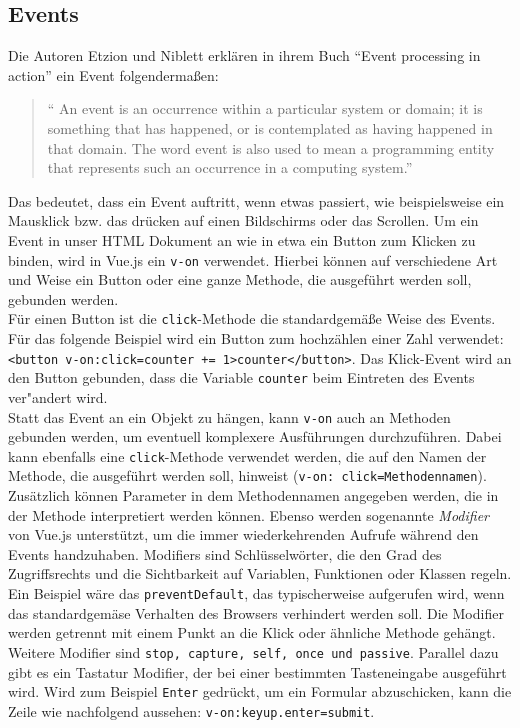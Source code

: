 \subsection*{Events}
Die Autoren Etzion und Niblett erkl\"aren in ihrem Buch \enquote{Event processing in action} ein Event folgenderma\ss{}en:
\begin{quotation}
\enquote{ An event is an occurrence within a particular system or domain; it is
something that has happened, or is contemplated as having happened in that
domain. The word event is also used to mean a programming entity that represents such an occurrence in a computing system\cite{Etzion&Niblett2011}.}
\end{quotation}
Das bedeutet, dass ein Event auftritt, wenn etwas passiert, wie beispielsweise ein Mausklick bzw. das dr\"ucken auf einen Bildschirms oder das Scrollen.
Um ein Event in unser \ac{HTML} Dokument an  wie in etwa ein Button zum Klicken zu binden, wird in Vue.js ein \texttt{v-on} verwendet. Hierbei k\"onnen auf verschiedene Art und Weise ein Button oder eine ganze Methode, die ausgef\"uhrt werden soll, gebunden werden.\\
F\"ur einen Button ist die \texttt{click}-Methode die standardgem\"a\ss{}e Weise des Events. F\"ur das folgende Beispiel wird ein Button zum hochz\"ahlen einer Zahl verwendet: \texttt{<button v-on:click=\grqq counter += 1\grqq>{{counter}}</button>}\cite{VueDokumentationEvent2018}. Das Klick-Event wird an den Button gebunden, dass die Variable \texttt{counter} beim Eintreten des Events ver"andert wird.\\
Statt das Event an ein Objekt zu h\"angen, kann \texttt{v-on} auch an Methoden gebunden werden, um eventuell komplexere Ausf\"uhrungen durchzuf\"uhren. Dabei  kann ebenfalls eine \texttt{click}-Methode verwendet werden, die auf den Namen der Methode, die ausgef\"uhrt werden soll, hinweist (\texttt{v-on: click=\grqq Methodennamen\grqq})\cite{VueDokumentationEvent2018}. Zus\"atzlich k\"onnen Parameter in dem Methodennamen angegeben werden, die in der Methode interpretiert werden k\"onnen. 
Ebenso werden sogenannte \textit{Modifier} von Vue.js unterst\"utzt, um die immer wiederkehrenden Aufrufe w\"ahrend den Events handzuhaben.
Modifiers sind Schl\"usselw\"orter, die den Grad des Zugriffsrechts und die Sichtbarkeit auf Variablen, Funktionen oder Klassen regeln.
Ein Beispiel w\"are das \texttt{preventDefault}, das typischerweise aufgerufen wird, wenn das standardgem\"ase Verhalten des Browsers verhindert werden soll. Die Modifier werden getrennt mit einem Punkt an die Klick oder \"ahnliche Methode geh\"angt. Weitere Modifier sind \texttt{stop, capture, self, once und passive}.
Parallel dazu gibt es ein Tastatur Modifier, der bei einer bestimmten Tasteneingabe ausgef\"uhrt wird. Wird zum Beispiel \texttt{Enter} gedr\"uckt, um ein Formular abzuschicken, kann die Zeile wie nachfolgend aussehen: \texttt{v-on:keyup.enter=\grqq submit\grqq}\cite{VueDokumentationEvent2018}.

